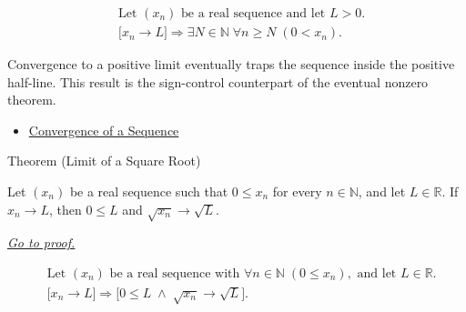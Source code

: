 \begin{remark*}
\[
\begin{aligned}
&\text{Let } (x_n) \text{ be a real sequence and let } L>0.\\
&\bigl[x_n\to L\bigr]
\Longrightarrow
\exists N\in\mathbb{N}\;\forall n\ge N\;(0<x_n).
\end{aligned}
\]
\end{remark*}

\begin{remark*}[Interpretation]
Convergence to a positive limit eventually traps the sequence inside the
positive half-line. This result is the sign-control counterpart of the
eventual nonzero theorem.
\end{remark*}

\begin{dependencies}
\begin{itemize}
  \item \hyperref[def:convergent-sequence]{Convergence of a Sequence}
\end{itemize}
\end{dependencies}


\begin{theorembox}{Theorem (Limit of a Square Root)}
\begin{theorem}
\label{thm:limit-of-a-square-root}
Let $(x_n)$ be a real sequence such that $0\le x_n$ for every
$n\in\mathbb{N}$, and let $L\in\mathbb{R}$. If $x_n\to L$, then
$0\le L$ and $\sqrt{x_n}\to\sqrt{L}$.

\smallskip
\noindent
\hyperref[prf:limit-of-a-square-root]{\textit{Go to proof.}}
\end{theorem}
\end{theorembox}

\begin{remark*}
\[
\begin{aligned}
&\text{Let } (x_n) \text{ be a real sequence with }
  \forall n\in\mathbb{N}\;(0\le x_n), \text{ and let } L\in\mathbb{R}.\\
&\bigl[x_n\to L\bigr]
\Longrightarrow
\bigl[0\le L \;\land\; \sqrt{x_n}\to\sqrt{L}\bigr].
\end{aligned}
\]
\end{remark*}

